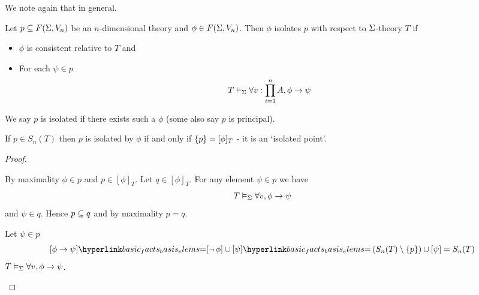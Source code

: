 We note again that  in general.

\begin{dfn}
    Let $p \subseteq F(\Sigma,V_n)$ be an $n$-dimensional theory and 
    $\phi \in F(\Sigma,V_n)$.
    Then $\phi$ isolates $p$ with respect to $\Sigma$-theory $T$ if 
    \begin{itemize}
        \item $\phi$ is consistent relative to $T$ and 
        \item For each $\psi \in p$ 
        \[
            T \vDash_{\Sigma} \forall v : \prod_{i = 1}^n A, \phi \to \psi
        \]
    \end{itemize}
    We say $p$ is isolated if there exists such a $\phi$ 
    (some also say $p$ is principal).
\end{dfn}

\begin{prop}
    If $p \in S_n(T)$ then $p$ is isolated by $\phi$ if and only if 
    $\left\{p\right\} = [\phi]_T$ - it is an `isolated point'. 
\end{prop}
\begin{proof}
    \begin{forward}
        By maximality $\phi \in p$ and $p \in [\phi]_T$.
        Let $q \in [\phi]_T$. For any element $\psi \in p$ 
        we have 
        \[T \vDash_{\Sigma} \forall v, \phi \to \psi\]
        and $\psi \in q$.
        Hence $p \subseteq q$ and by maximality $p = q$.
    \end{forward}

    \begin{backward}
        Let $\psi \in p$
        \[
            [\phi \to \psi] \linkto{basic_facts_basis_elems}{=} 
            [\NOT \phi] \cup [\psi] \linkto{basic_facts_basis_elems}{=} 
            \brkt{S_n(T) \setminus \set{p}} \cup [\psi] = S_n(T)
        \]
        $T \vDash_{\Sigma} \forall v, \phi \to \psi$.
    \end{backward}
\end{proof}

